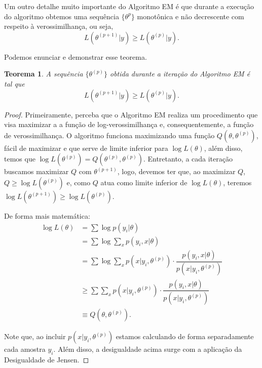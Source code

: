 \documentclass{article}
\newtheorem{theorem}{Teorema}
\begin{document}
Um outro detalhe muito importante do Algoritmo EM é que durante a execução do algoritmo obtemos uma sequência $\{\theta^{p}\}$ monotônica e não decrescente com respeito à verossimilhança, ou seja,
\[L\left(\theta^{(p + 1)} | y\right) \geq L\left(\theta^{(p)} | y\right).\]

Podemos enunciar e demonstrar esse teorema.

\begin{theorem}
    \label{teo}
    A sequência $\{\theta^{(p)}\}$ obtida durante a iteração do Algoritmo EM é tal que
    \[L\left(\theta^{(p + 1)} | y\right) \geq L\left(\theta^{(p)} | y\right).\]
\end{theorem}

\begin{proof}
    Primeiramente, perceba que o Algoritmo EM realiza um procedimento que visa maximizar a a função de log-verossimilhança e, consequentemente, a função de verossimilhança. O algoritmo funciona maximizando uma função $Q(\theta, \theta^{(p)})$, fácil de maximizar e que serve de limite inferior para $\log{L(\theta)}$, além disso, temos que $\log{L(\theta^{(p)})} = Q(\theta^{(p)}, \theta^{(p)})$. Entretanto, a cada iteração buscamos maximizar $Q$ com $\theta^{(p + 1)}$, logo, devemos ter que, ao maximizar $Q$, $Q\geq \log{L(\theta^{(p)})}$ e, como $Q$ atua como limite inferior de $\log{L(\theta)}$, teremos $\log{L(\theta^{(p + 1)})}\geq \log{L(\theta^{(p)})}$.
    
    De forma mais matemática:
    \begin{equation*}
        \begin{split}
            \log{L(\theta)} & = \sum \log{p(y_i | \theta)} \\
            & = \sum \log{\sum_x p(y_i, x | \theta)} \\
            & = \sum \log{\sum_x p\left(x | y_i, \theta^{(p)}\right)\cdot \dfrac{p(y_i, x | \theta)}{p\left(x | y_i, \theta^{(p)}\right)}} \\
            & \geq \sum \sum_x p\left(x | y_i, \theta^{(p)}\right)\cdot \dfrac{p(y_i, x | \theta)}{p\left(x | y_i, \theta^{(p)}\right)} \\
            & \equiv Q\left(\theta, \theta^{(p)}\right).
        \end{split}
    \end{equation*}
    
    Note que, ao incluir $p\left(x | y_i, \theta^{(p)}\right)$ estamos calculando de forma separadamente cada amostra $y_i$. Além disso, a desigualdade acima surge com a aplicação da Desigualdade de Jensen.
    

\end{proof}
\end{document}
